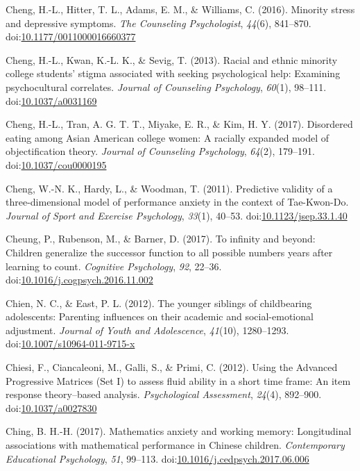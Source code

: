 \documentclass[english,man]{apa6}
\theoremstyle{definition}
\theoremstyle{definition}
\theoremstyle{definition}
\theoremstyle{remark}
\begin{document}
\hypertarget{ref-Cheng2016}{}
Cheng, H.-L., Hitter, T. L., Adams, E. M., \& Williams, C. (2016).
Minority stress and depressive symptoms. \emph{The Counseling
Psychologist}, \emph{44}(6), 841--870.
doi:\href{https://doi.org/10.1177/0011000016660377}{10.1177/0011000016660377}

\hypertarget{ref-Cheng2013}{}
Cheng, H.-L., Kwan, K.-L. K., \& Sevig, T. (2013). Racial and ethnic
minority college students' stigma associated with seeking psychological
help: Examining psychocultural correlates. \emph{Journal of Counseling
Psychology}, \emph{60}(1), 98--111.
doi:\href{https://doi.org/10.1037/a0031169}{10.1037/a0031169}

\hypertarget{ref-Cheng2017}{}
Cheng, H.-L., Tran, A. G. T. T., Miyake, E. R., \& Kim, H. Y. (2017).
Disordered eating among Asian American college women: A racially
expanded model of objectification theory. \emph{Journal of Counseling
Psychology}, \emph{64}(2), 179--191.
doi:\href{https://doi.org/10.1037/cou0000195}{10.1037/cou0000195}

\hypertarget{ref-Cheng2011}{}
Cheng, W.-N. K., Hardy, L., \& Woodman, T. (2011). Predictive validity
of a three-dimensional model of performance anxiety in the context of
Tae-Kwon-Do. \emph{Journal of Sport and Exercise Psychology},
\emph{33}(1), 40--53.
doi:\href{https://doi.org/10.1123/jsep.33.1.40}{10.1123/jsep.33.1.40}

\hypertarget{ref-Cheung2017}{}
Cheung, P., Rubenson, M., \& Barner, D. (2017). To infinity and beyond:
Children generalize the successor function to all possible numbers years
after learning to count. \emph{Cognitive Psychology}, \emph{92}, 22--36.
doi:\href{https://doi.org/10.1016/j.cogpsych.2016.11.002}{10.1016/j.cogpsych.2016.11.002}

\hypertarget{ref-Chien2012}{}
Chien, N. C., \& East, P. L. (2012). The younger siblings of
childbearing adolescents: Parenting influences on their academic and
social-emotional adjustment. \emph{Journal of Youth and Adolescence},
\emph{41}(10), 1280--1293.
doi:\href{https://doi.org/10.1007/s10964-011-9715-x}{10.1007/s10964-011-9715-x}

\hypertarget{ref-Chiesi2012}{}
Chiesi, F., Ciancaleoni, M., Galli, S., \& Primi, C. (2012). Using the
Advanced Progressive Matrices (Set I) to assess fluid ability in a short
time frame: An item response theory--based analysis. \emph{Psychological
Assessment}, \emph{24}(4), 892--900.
doi:\href{https://doi.org/10.1037/a0027830}{10.1037/a0027830}

\hypertarget{ref-Ching2017}{}
Ching, B. H.-H. (2017). Mathematics anxiety and working memory:
Longitudinal associations with mathematical performance in Chinese
children. \emph{Contemporary Educational Psychology}, \emph{51},
99--113.
doi:\href{https://doi.org/10.1016/j.cedpsych.2017.06.006}{10.1016/j.cedpsych.2017.06.006}
\end{document}
